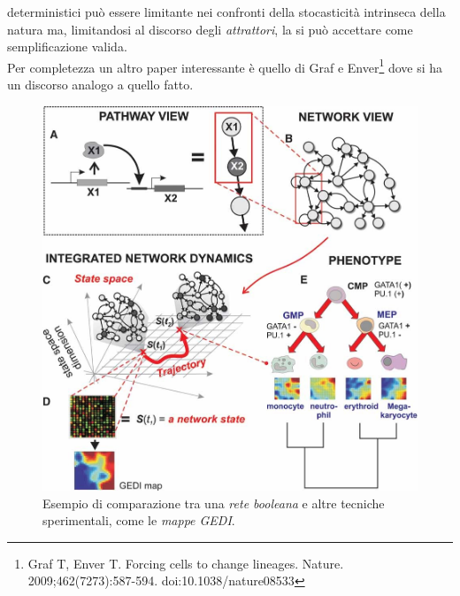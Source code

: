 \documentclass[a4paper,12pt, oneside]{book}
\begin{document}
deterministici può essere limitante nei confronti della stocasticità intrinseca
della natura ma, limitandosi al discorso degli \textit{attrattori}, la si può
accettare come semplificazione valida.\\
Per completezza un altro paper interessante è quello di Graf e
Enver\footnote{Graf T, Enver T. Forcing cells to change
  lineages. Nature. 2009;462(7273):587-594. doi:10.1038/nature08533} dove si ha
un discorso analogo a quello fatto.\\
\begin{figure}
  \centering
  \includegraphics[scale = 0.30]{img/exbool3.jpg}
  \caption{Esempio di comparazione tra una \textit{rete booleana} e altre
    tecniche sperimentali, come le \textit{mappe GEDI}.}  
  \label{fig:exbool3}
\end{figure}
\end{document}
